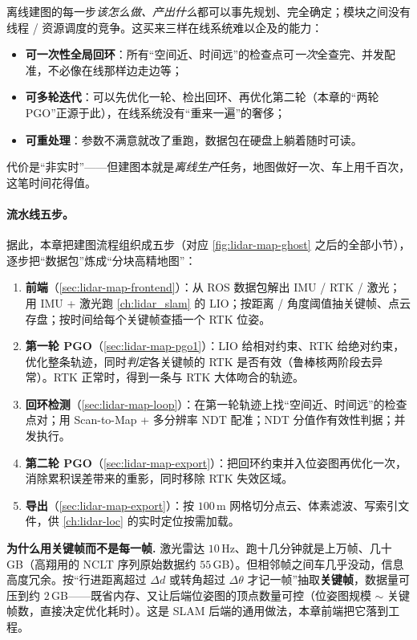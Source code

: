 \begin{insight}[离线 = 把时间换成质量]
离线建图的每一步\emph{该怎么做、产出什么}都可以事先规划、完全确定；模块之间没有线程 / 资源调度的竞争。这买来三样在线系统难以企及的能力：
\begin{itemize}
  \item \textbf{可一次性全局回环}：所有“空间近、时间远”的检查点可\emph{一次}全查完、并发配准，不必像在线那样边走边等；
  \item \textbf{可多轮迭代}：可以先优化一轮、检出回环、再优化第二轮（本章的“两轮 PGO”正源于此），在线系统没有“重来一遍”的奢侈；
  \item \textbf{可重处理}：参数不满意就改了重跑，数据包在硬盘上躺着随时可读。
\end{itemize}
代价是“非实时”——但建图本就是\emph{离线生产}任务，地图做好一次、车上用千百次，这笔时间花得值。
\end{insight}

\paragraph{流水线五步。}
据此，本章把建图流程组织成五步（对应 \cref{fig:lidar-map-ghost} 之后的全部小节），逐步把“数据包”炼成“分块高精地图”\cite{gao2023slamad}：
\begin{enumerate}
  \item \textbf{前端}（\cref{sec:lidar-map-frontend}）：从 ROS 数据包解出 IMU / RTK / 激光；用 IMU + 激光跑 \cref{ch:lidar_slam} 的 LIO；按距离 / 角度阈值抽关键帧、点云存盘；按时间给每个关键帧查插一个 RTK 位姿。
  \item \textbf{第一轮 PGO}（\cref{sec:lidar-map-pgo1}）：LIO 给相对约束、RTK 给绝对约束，优化整条轨迹，同时\emph{判定}各关键帧的 RTK 是否有效（鲁棒核两阶段去异常）。RTK 正常时，得到一条与 RTK 大体吻合的轨迹。
  \item \textbf{回环检测}（\cref{sec:lidar-map-loop}）：在第一轮轨迹上找“空间近、时间远”的检查点对；用 Scan-to-Map + 多分辨率 NDT 配准；NDT 分值作有效性判据；并发执行。
  \item \textbf{第二轮 PGO}（\cref{sec:lidar-map-export}）：把回环约束并入位姿图再优化一次，消除累积误差带来的重影，同时移除 RTK 失效区域。
  \item \textbf{导出}（\cref{sec:lidar-map-export}）：按 $100$\,m 网格切分点云、体素滤波、写索引文件，供 \cref{ch:lidar-loc} 的实时定位按需加载。
\end{enumerate}

\begin{note}
\textbf{为什么用关键帧而不是每一帧.}\;
激光雷达 $10$\,Hz、跑十几分钟就是上万帧、几十 GB（高翔用的 NCLT 序列原始数据约 $55$\,GB）。但相邻帧之间车几乎没动，信息高度冗余。按“行进距离超过 $\Delta d$ 或转角超过 $\Delta\theta$ 才记一帧”抽取\textbf{关键帧}，数据量可压到约 $2$\,GB——既省内存、又让后端位姿图的顶点数量可控（位姿图规模 $\sim$ 关键帧数，直接决定优化耗时）。这是 SLAM 后端的通用做法，本章前端把它落到工程。
\end{note}

